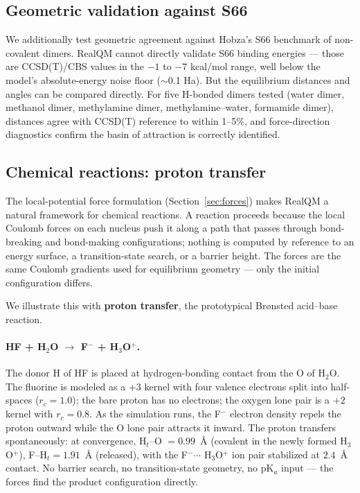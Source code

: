 \documentclass[11pt]{article}
\begin{document}
\subsection{Geometric validation against S66}

We additionally test geometric agreement against Hobza's S66 benchmark of non-covalent dimers. RealQM cannot directly validate S66 binding energies --- those are CCSD(T)/CBS values in the $-1$ to $-7$ kcal/mol range, well below the model's absolute-energy noise floor ($\sim$0.1 Ha). But the equilibrium distances and angles can be compared directly. For five H-bonded dimers tested (water dimer, methanol dimer, methylamine dimer, methylamine--water, formamide dimer), distances agree with CCSD(T) reference to within 1--5\%, and force-direction diagnostics confirm the basin of attraction is correctly identified.

\subsection{Chemical reactions: proton transfer}\label{sec:reactions}

The local-potential force formulation (Section~\ref{sec:forces}) makes RealQM a natural framework for chemical reactions. A reaction proceeds because the local Coulomb forces on each nucleus push it along a path that passes through bond-breaking and bond-making configurations; nothing is computed by reference to an energy surface, a transition-state search, or a barrier height. The forces are the same Coulomb gradients used for equilibrium geometry --- only the initial configuration differs.

We illustrate this with \textbf{proton transfer}, the prototypical Br\o nsted acid--base reaction.

\paragraph{HF + H$_2$O $\to$ F$^-$ + H$_3$O$^+$.}
The donor H of HF is placed at hydrogen-bonding contact from the O of H$_2$O. The fluorine is modeled as a $+3$ kernel with four valence electrons split into half-spaces ($r_c = 1.0$); the bare proton has no electrons; the oxygen lone pair is a $+2$ kernel with $r_c = 0.8$. As the simulation runs, the F$^-$ electron density repels the proton outward while the O lone pair attracts it inward. The proton transfers spontaneously: at convergence, H$_t$--O $= 0.99$~\AA{} (covalent in the newly formed H$_3$O$^+$), F--H$_t = 1.91$~\AA{} (released), with the F$^- \cdots$ H$_3$O$^+$ ion pair stabilized at $2.4$~\AA{} contact. No barrier search, no transition-state geometry, no pK$_a$ input --- the forces find the product configuration directly.
\end{document}
